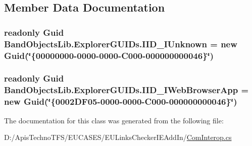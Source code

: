 \subsection{Member Data Documentation}
\hypertarget{class_band_objects_lib_1_1_explorer_g_u_i_ds_a1f4ada2953b3094dffda5ebee6119e95}{
\subsubsection[{I\+I\+D\+\_\+\+I\+Unknown}]{\setlength{\rightskip}{0pt plus 5cm}readonly Guid Band\+Objects\+Lib.\+Explorer\+G\+U\+I\+Ds.\+I\+I\+D\+\_\+\+I\+Unknown = new Guid(\char`\"{}\{00000000-\/0000-\/0000-\/C000-\/000000000046\}\char`\"{})\hspace{0.3cm}{\ttfamily [static]}}}\label{class_band_objects_lib_1_1_explorer_g_u_i_ds_a1f4ada2953b3094dffda5ebee6119e95}
\hypertarget{class_band_objects_lib_1_1_explorer_g_u_i_ds_a71ffc05393a492f0d86efd47e49fe4c6}{
\subsubsection[{I\+I\+D\+\_\+\+I\+Web\+Browser\+App}]{\setlength{\rightskip}{0pt plus 5cm}readonly Guid Band\+Objects\+Lib.\+Explorer\+G\+U\+I\+Ds.\+I\+I\+D\+\_\+\+I\+Web\+Browser\+App = new Guid(\char`\"{}\{0002\+D\+F05-\/0000-\/0000-\/\+C000-\/000000000046\}\char`\"{})\hspace{0.3cm}{\ttfamily [static]}}}\label{class_band_objects_lib_1_1_explorer_g_u_i_ds_a71ffc05393a492f0d86efd47e49fe4c6}


The documentation for this class was generated from the following file\+:\begin{DoxyCompactItemize}
\item 
D\+:/\+Apis\+Techno\+T\+F\+S/\+E\+U\+C\+A\+S\+E\+S/\+E\+U\+Links\+Checker\+I\+E\+Add\+In/\hyperlink{_com_interop_8cs}{Com\+Interop.\+cs}\end{DoxyCompactItemize}
